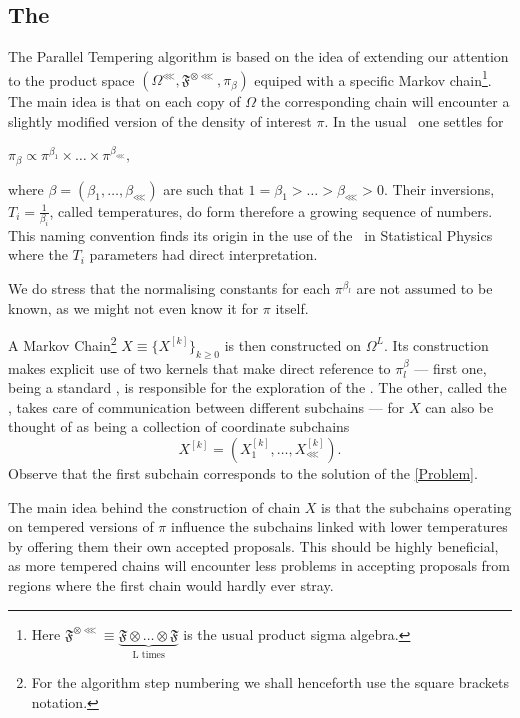 
\subsection*{The \PT} 
The Parallel Tempering algorithm is based on the idea of extending our attention to the product space $(\Omega^\lll, \mathfrak{F}^{\otimes \lll}, \pi_\beta)$ equiped with a specific Markov chain\footnote{Here $\mathfrak{F}^{\otimes \lll} \equiv \underbrace{\mathfrak{F} \otimes \dots \otimes \mathfrak{F}}_{\text{L times}}$ is the usual product sigma algebra.}. The main idea is that on each copy of $\Omega$ the corresponding chain will encounter a slightly modified version of the density of interest $\pi$. In the usual \PT\, one settles for 

\begin{assumptions}
	\item $\pi_\beta \propto \pi^{\beta_1} \times \dots \times \pi^{\beta_\lll},$\label{product form}
\end{assumptions}	

where $\beta = (\beta_1 , \dots , \beta_\lll)$ are such that $1 = \beta_1 > \dots > \beta_\lll > 0$. Their inversions, $T_i = \frac{1}{\beta_i}$, called temperatures, do form therefore a growing sequence of numbers. This naming convention finds its origin in the use of the \PT\, in Statistical Physics where the $T_i$ parameters had direct interpretation. 

We do stress that the normalising constants for each $\pi^{\beta_l}$ are not assumed to be known, as we might not even know it for $\pi$ itself.

A Markov Chain\footnote{For the algorithm step numbering we shall henceforth use the square brackets notation.} $X \equiv \{ X^{[k]}\}_{k \geq 0}$ is then constructed on $\Omega^L$. Its construction makes explicit use of two kernels that make direct reference to $\pi^\beta_l$ --- first one, being a standard \randomWalk, is responsible for the exploration of the \sspace. The other, called the \swapStep, takes care of communication between different subchains ---  for $X$ can also be thought of as being a collection of coordinate subchains 
$$X^{[k]} = (X_1^{[k]}, \dots, X_\lll^{[k]}).$$
Observe that the first subchain corresponds to the solution of the \ref{Problem}.

The main idea behind the construction of chain $X$ is that the subchains operating on tempered versions of $\pi$ influence the subchains linked with lower temperatures by offering them their own accepted proposals. This should be highly beneficial, as more tempered chains will encounter less problems in accepting proposals from regions where the first chain would hardly ever stray.  

